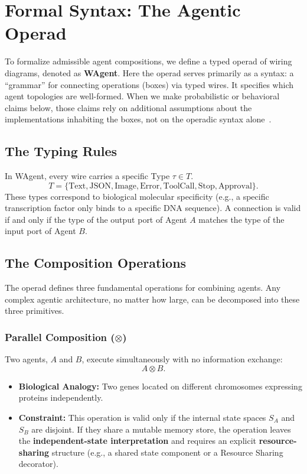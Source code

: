 \section{Formal Syntax: The Agentic Operad}\label{sec:operad}

To formalize admissible agent compositions, we define a typed operad of wiring diagrams, denoted as
\textbf{WAgent}. Here the operad serves primarily as a syntax: a ``grammar'' for connecting operations
(boxes) via typed wires. It specifies which agent topologies are well-formed. When we make probabilistic
or behavioral claims below, those claims rely on additional assumptions about the implementations
inhabiting the boxes, not on the operadic syntax alone~\cite{vagner2015algebras}.

\subsection{The Typing Rules}

In WAgent, every wire carries a specific Type $\tau\in T$.
\begin{equation}
T = \{\text{Text}, \text{JSON}, \text{Image}, \text{Error}, \text{ToolCall}, \text{Stop}, \text{Approval}\}.
\label{eq:wire-types}
\end{equation}
These types correspond to biological molecular specificity (e.g., a specific transcription factor only binds to
a specific DNA sequence). A connection is valid if and only if the type of the output port of Agent $A$ matches
the type of the input port of Agent $B$.

\subsection{The Composition Operations}

The operad defines three fundamental operations for combining agents. Any complex agentic architecture, no
matter how large, can be decomposed into these three primitives.

\subsubsection{Parallel Composition ($\otimes$)}

Two agents, $A$ and $B$, execute simultaneously with no information exchange:
\begin{equation}
A \otimes B.
\label{eq:parallel-composition}
\end{equation}
\begin{itemize}[leftmargin=*]
\item \textbf{Biological Analogy:} Two genes located on different chromosomes expressing proteins independently.
\item \textbf{Constraint:} This operation is valid only if the internal state spaces $S_A$ and $S_B$ are disjoint.
If they share a mutable memory store, the operation leaves the \textbf{independent-state interpretation} and
requires an explicit \textbf{resource-sharing} structure (e.g., a shared state component or a Resource Sharing
decorator).
\end{itemize}

